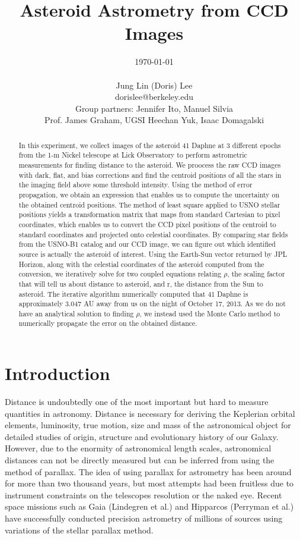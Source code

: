 \documentclass[authoryear, 12pt,5p, times]{elsarticle}
\begin{document}
\begin{frontmatter}
\title{Asteroid Astrometry from CCD Images}
\author{\today \\ \quad \\Jung Lin (Doris) Lee\\ dorislee@berkeley.edu\\Group partners: Jennifer Ito, Manuel Silvia\\Prof. James Graham, UGSI Heechan Yuk, Isaac Domagalski}
	\begin{abstract}
In this experiment, we collect images of the asteroid 41 Daphne at 3 different epochs from the 1-m Nickel telescope at Lick Observatory to perform astrometric measurements for finding distance to the asteroid. We proocess the raw CCD images with dark, flat, and bias corrections and find the centroid positions of all the stars in the imaging field above some threshold intensity. Using the method of error propagation, we obtain an expression that enables us to compute the uncertainty on the obtained centroid positions. The method of least square applied to USNO stellar positions yields a transformation matrix that maps from standard Cartesian to pixel coordinates, which enables us to convert the CCD pixel positions of the centroid to standard coordinates and projected onto celestial coordinates. By comparing star fields from the USNO-B1 catalog and our CCD image, we can figure out which identified source is actually the asteroid of interest. Using the Earth-Sun vector returned by JPL Horizon, along with the celestial coordinates of the asteroid computed from the conversion, we iteratively solve for two coupled equations relating $\rho$, the scaling factor that will tell us about distance to asteroid, and r, the distance from the Sun to asteroid. The iterative algorithm numerically computed that 41 Daphne is approximately 3.047 AU away from us on the night of October 17, 2013. As we do not have an analytical solution to finding $\rho$, we instead used the Monte Carlo method to numerically propagate the error on the obtained distance.
	\end{abstract}
\end{frontmatter}
\section{Introduction}
Distance is undoubtedly one of the most important but hard to measure quantities in astronomy. Distance is necessary for deriving the Keplerian orbital elements, luminosity, true motion, size and mass of the astronomical object for detailed studies of origin, structure and evolutionary history of our Galaxy. However, due to the enormity of astronomical length scales, astronomical distances can not be directly measured but can be inferred from using the method of parallax. The idea of using parallax for astrometry has been around for more than two thousand years, but most attempts had been fruitless due to instrument constraints on the telescopes resolution or the naked eye. Recent space missions such as Gaia (Lindegren et al.) and  Hipparcos (Perryman et al.) have successfully conducted precision astrometry of millions of sources using variations of the stellar parallax method.
\end{document}
